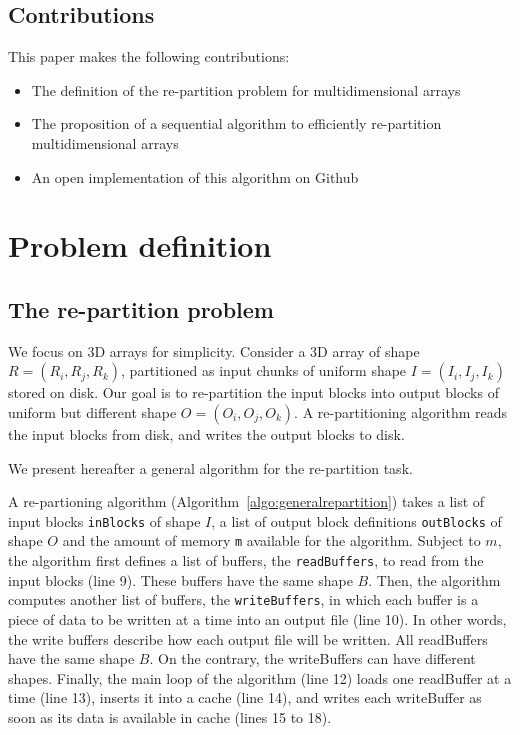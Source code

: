\documentclass[conference]{IEEEtran}
\begin{document}
\subsection{Contributions}
This paper makes the following contributions:
\begin{itemize}
  \item The definition of the re-partition problem for multidimensional arrays
  \item The proposition of a sequential algorithm to efficiently
  re-partition multidimensional arrays
  \item An open implementation of this algorithm on Github
\end{itemize}

\section{Problem definition}
\subsection{The re-partition problem}
We focus on 3D arrays for simplicity. Consider a 3D array of shape $R =
(R_i, R_j, R_k)$, partitioned as input chunks of uniform shape $I = (I_i,
I_j, I_k)$ stored on disk. Our goal is to re-partition the input blocks into
output blocks of uniform but different shape $O = (O_i, O_j, O_k)$.
A re-partitioning algorithm reads the input blocks from disk, and writes the
output blocks to disk.

We present hereafter a general algorithm for the re-partition task.

A re-partioning algorithm (Algorithm~\ref{algo:generalrepartition}) takes a
list of input blocks \texttt{inBlocks} of shape $I$, a list of output block
definitions \texttt{outBlocks} of shape $O$ and the amount of memory \texttt{m}
available for the algorithm.
Subject to $m$, the algorithm first defines a list of buffers, the
\texttt{readBuffers}, to read from the input blocks (line 9).
These buffers have the same shape $B$.
Then, the algorithm computes another list of buffers, the \texttt{writeBuffers},
in which each buffer is a piece of data to be written at a time into an
output file (line 10).
In other words, the write buffers describe how each output file will be written.
All readBuffers have the same shape $B$. On the contrary, the writeBuffers can
have different shapes.
Finally, the main loop of the algorithm (line 12) loads one readBuffer at a
time (line 13), inserts it into a cache (line 14), and writes each writeBuffer
as soon as its data is available in cache (lines 15 to 18).
\end{document}
